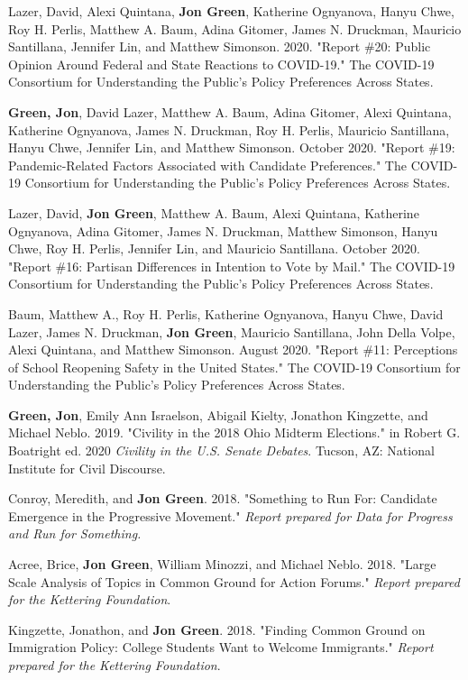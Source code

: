 \documentclass[letterpaper]{article}
\renewenvironment{itemize}{
  \begin{list}{}{
    \setlength{\leftmargin}{1.5em}
  }
}{
  \end{list}
}
\begin{document}
\begin{itemize}
\item Lazer, David, Alexi Quintana, \textbf{Jon Green}, Katherine Ognyanova, Hanyu Chwe, Roy H. Perlis, Matthew A. Baum, Adina Gitomer, James N. Druckman, Mauricio Santillana, Jennifer Lin, and Matthew Simonson. 2020. "Report \#20: Public Opinion Around Federal and State Reactions to COVID-19." The COVID-19 Consortium for Understanding the Public’s Policy Preferences Across States.

\item \textbf{Green, Jon}, David Lazer, Matthew A. Baum, Adina Gitomer, Alexi Quintana, Katherine Ognyanova, James N. Druckman, Roy H. Perlis, Mauricio Santillana, Hanyu Chwe, Jennifer Lin, and Matthew Simonson. October 2020. "Report \#19: Pandemic-Related Factors Associated with Candidate Preferences." The COVID-19 Consortium for Understanding the Public’s Policy Preferences Across States.

\item Lazer, David, \textbf{Jon Green}, Matthew A. Baum, Alexi Quintana, Katherine Ognyanova, Adina Gitomer, James N. Druckman, Matthew Simonson, Hanyu Chwe, Roy H. Perlis, Jennifer Lin, and Mauricio Santillana. October 2020. "Report \#16: Partisan Differences in Intention to Vote by Mail." The COVID-19 Consortium for Understanding the Public’s Policy Preferences Across States.

\item Baum, Matthew A., Roy H. Perlis, Katherine Ognyanova, Hanyu Chwe, David Lazer, James N. Druckman, \textbf{Jon Green}, Mauricio Santillana, John Della Volpe, Alexi Quintana, and Matthew Simonson. August 2020. "Report \#11: Perceptions of School Reopening Safety in the United States." The COVID-19 Consortium for Understanding the Public’s Policy Preferences Across States.

\item \textbf{Green, Jon}, Emily Ann Israelson, Abigail Kielty, Jonathon Kingzette, and Michael Neblo. 2019. "Civility in the 2018 Ohio Midterm Elections." in Robert G. Boatright ed. 2020 \textit{Civility in the U.S. Senate Debates}. Tucson, AZ: National Institute for Civil Discourse.

\item Conroy, Meredith, and \textbf{Jon Green}. 2018. "Something to Run For: Candidate Emergence in the Progressive Movement." \textit{Report prepared for Data for Progress and Run for Something.}

\item Acree, Brice, \textbf{Jon Green}, William Minozzi, and Michael Neblo. 2018. "Large Scale Analysis of Topics in Common Ground for Action Forums." \textit{Report prepared for the Kettering Foundation}.

\item Kingzette, Jonathon, and \textbf{Jon Green}. 2018. "Finding Common Ground on Immigration Policy: College Students Want to Welcome Immigrants." \textit{Report prepared for the Kettering Foundation}.
\end{itemize}
\end{document}
